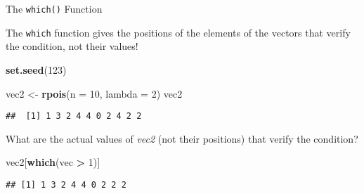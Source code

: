 \documentclass[ignorenonframetext,]{beamer}
\newenvironment{Shaded}{\begin{snugshade}}{\end{snugshade}}
\newcommand{\DataTypeTok}[1]{\textcolor[rgb]{0.13,0.29,0.53}{#1}}
\newcommand{\DecValTok}[1]{\textcolor[rgb]{0.00,0.00,0.81}{#1}}
\newcommand{\KeywordTok}[1]{\textcolor[rgb]{0.13,0.29,0.53}{\textbf{#1}}}
\newcommand{\NormalTok}[1]{#1}
\newcommand{\OperatorTok}[1]{\textcolor[rgb]{0.81,0.36,0.00}{\textbf{#1}}}
\newcommand{\StringTok}[1]{\textcolor[rgb]{0.31,0.60,0.02}{#1}}
\begin{document}
\begin{frame}[fragile]{The \texttt{which()} Function}
\protect\hypertarget{the-which-function-3}{}

The \texttt{which} function gives the positions of the elements of the
vectors that verify the condition, not their values!

\begin{Shaded}
\begin{Highlighting}[]
\KeywordTok{set.seed}\NormalTok{(}\DecValTok{123}\NormalTok{)}

\NormalTok{vec2 <-}\StringTok{ }\KeywordTok{rpois}\NormalTok{(}\DataTypeTok{n =} \DecValTok{10}\NormalTok{, }\DataTypeTok{lambda =} \DecValTok{2}\NormalTok{)}
\NormalTok{vec2}
\end{Highlighting}
\end{Shaded}

\begin{verbatim}
##  [1] 1 3 2 4 4 0 2 4 2 2
\end{verbatim}

What are the actual values of \textit{vec2} (not their positions) that
verify the condition?

\begin{Shaded}
\begin{Highlighting}[]
\NormalTok{vec2[}\KeywordTok{which}\NormalTok{(vec }\OperatorTok{>}\StringTok{ }\DecValTok{1}\NormalTok{)]}
\end{Highlighting}
\end{Shaded}

\begin{verbatim}
## [1] 1 3 2 4 4 0 2 2 2
\end{verbatim}

\end{frame}
\end{document}
